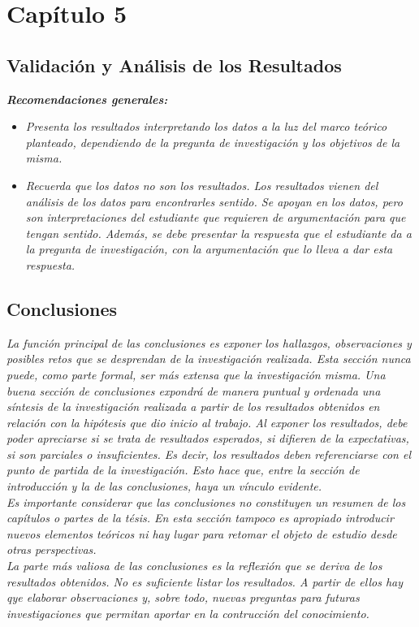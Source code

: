 \chapter{Capítulo 5}

\section{Validación y Análisis de los Resultados}

\textit{\textbf{Recomendaciones generales:}}
\begin{itemize}
  \item \textit{Presenta los resultados interpretando los datos a la luz del marco teórico planteado, dependiendo de la pregunta de investigación y los objetivos de la misma.}
  \item \textit{Recuerda que los datos no son los resultados. Los resultados vienen del análisis de los datos para encontrarles sentido. Se apoyan en los datos, pero son interpretaciones del estudiante que requieren de argumentación para que tengan sentido. Además, se debe presentar la respuesta que el estudiante da a la pregunta de investigación, con la argumentación que lo lleva a dar esta respuesta.}
\end{itemize}

\section{Conclusiones}

\textit{La función principal de las conclusiones es exponer los hallazgos, observaciones y posibles retos que se desprendan de la investigación realizada. Esta sección nunca puede, como parte formal, ser más extensa que la investigación misma. Una buena sección de conclusiones expondrá de manera puntual y ordenada una síntesis de la investigación realizada a partir de los resultados obtenidos en relación con la hipótesis que dio inicio al trabajo. Al exponer los resultados, debe poder apreciarse si se trata de resultados esperados, si difieren de la expectativas, si son parciales o insuficientes. Es decir, los resultados deben referenciarse con el punto de partida de la investigación. Esto hace que, entre la sección de introducción y la de las conclusiones, haya un vínculo evidente.}\\

\textit{Es importante considerar que las conclusiones no constituyen un resumen de los capítulos o partes de la tésis. En esta sección tampoco es apropiado introducir nuevos elementos teóricos ni hay lugar para retomar el objeto de estudio desde otras perspectivas.}\\

\textit{La parte más valiosa de las conclusiones es la reflexión que se deriva de los resultados obtenidos. No es suficiente listar los resultados. A partir de ellos hay qye elaborar observaciones y, sobre todo, nuevas preguntas para futuras investigaciones que permitan aportar en la contrucción del conocimiento.}